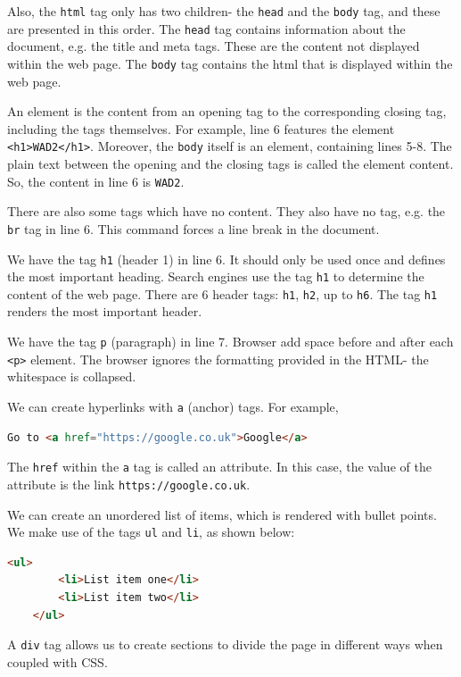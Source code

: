 \documentclass[a4paper, openany]{memoir}
\begin{document}
    \noindent Also, the \texttt{html} tag only has two children- the \texttt{head} and the \texttt{body} tag, and these are presented in this order. The \texttt{head} tag contains information about the document, e.g. the title and meta tags. These are the content not displayed within the web page. The \texttt{body} tag contains the html that is displayed within the web page.

    \noindent An element is the content from an opening tag to the corresponding closing tag, including the tags themselves. For example, line 6 features the element \texttt{<h1>WAD2</h1>}. Moreover, the \texttt{body} itself is an element, containing lines 5-8. The plain text between the opening and the closing tags is called the element content. So, the content in line 6 is \texttt{WAD2}.

    \noindent There are also some tags which have no content. They also have no tag, e.g. the \texttt{br} tag in line 6. This command forces a line break in the document.

    \noindent We have the tag \texttt{h1} (header 1) in line 6. It should only be used once and defines the most important heading. Search engines use the tag \texttt{h1} to determine the content of the web page. There are 6 header tags: \texttt{h1}, \texttt{h2}, up to \texttt{h6}. The tag \texttt{h1} renders the most important header.

    \noindent We have the tag \texttt{p} (paragraph) in line 7. Browser add space before and after each \texttt{<p>} element. The browser ignores the formatting provided in the HTML- the whitespace is collapsed.

    \noindent We can create hyperlinks with \texttt{a} (anchor) tags. For example,
    \begin{lstlisting}[language=html]
    Go to <a href="https://google.co.uk">Google</a>
    \end{lstlisting}
    The \texttt{href} within the \texttt{a} tag is called an attribute. In this case, the value of the attribute is the link \texttt{https://google.co.uk}.

    \noindent We can create an unordered list of items, which is rendered with bullet points. We make use of the tags \texttt{ul} and \texttt{li}, as shown below:
    \begin{lstlisting}[language=html]
    <ul>
        <li>List item one</li>
        <li>List item two</li>
    </ul>
    \end{lstlisting}

    \noindent A \texttt{div} tag allows us to create sections to divide the page in different ways when coupled with CSS.
\end{document}
